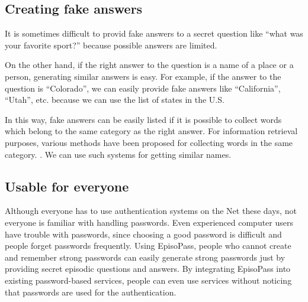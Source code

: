 \documentclass{article}
\begin{document}
\subsection{Creating fake answers}


It is sometimes difficult to provid fake answers to a secret question like
``what was your favorite sport?''
because possible answers are limited.



On the other hand, if the right answer to the question is a name of a place or a person,
generating similar answers is easy.
For example, if the answer to the question is ``Colorado'',
we can easily provide fake answers like ``California'', ``Utah'', etc.
because we can use the list of states in the U.S.

In this way, fake answers can be easily listed
if it is possible to collect words which belong to the same
category as the right answer.
%
For information retrieval purposes,
various methods have been proposed for collecting words in the
same category.
\cite{Huang:2012:LFC:2426725.2426728}%
\cite{BooWa}%
\cite{Wang:2007:LSE:1441428.1442086}%
\cite{大島裕明:2006-12-15}.%
We can use such systems for getting similar names.

\subsection{Usable for everyone}

Although everyone has to use authentication systems on the Net these days,
not everyone is familiar with handling passwords.
Even experienced computer users have trouble with passwords,
since choosing a good password is difficult and people forget passwords frequently.
Using EpisoPass, people who cannot create and remember strong passwords
can easily generate strong passwords just by providing secret episodic
questions and answers.
By integrating EpisoPass into existing password-based services,
people can even use services without noticing that passwords are
used for the authentication.
\end{document}
